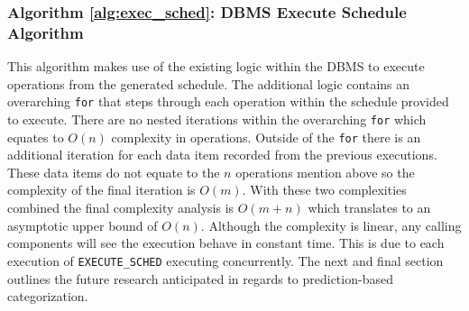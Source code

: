 \documentclass[conference]{IEEEtran}
\begin{document}

\subsubsection{Algorithm \ref{alg:exec_sched}: DBMS Execute Schedule Algorithm}
\label{alg_complexity:exec_sched}
This algorithm makes use of the existing logic within the DBMS to execute operations from the generated schedule. The additional logic contains an overarching \verb|for| that steps through each operation within the schedule provided to execute. There are no nested iterations within the overarching \verb|for| which equates to $O(n)$ complexity in operations. Outside of the \verb|for| there is an additional iteration for each data item recorded from the previous executions. These data items do not equate to the $n$ operations mention above so the complexity of the final iteration is $O(m)$. With these two complexities combined the final complexity analysis is $O(m+n)$ which translates to an asymptotic upper bound of $O(n)$. Although the complexity is linear, any calling components will see the execution behave in constant time. This is due to each execution of \verb|EXECUTE_SCHED| executing concurrently. The next and final section outlines the future research anticipated in regards to prediction-based categorization.
\end{document}
